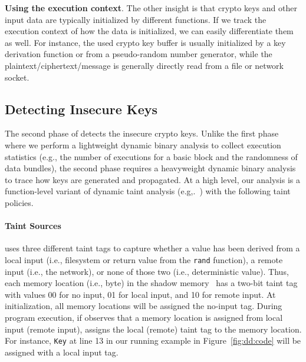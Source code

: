 {\begin{compactitem}
\item \textbf{Using the execution context}.
The other insight is that crypto keys and other input data are typically initialized by different functions. 
If we track the execution context of how the data is initialized, we can easily differentiate them as well. 
For instance, the used crypto key buffer is usually initialized by a key derivation function or from a pseudo-random number generator, while the plaintext/ciphertext/message is generally directly read from a file or network socket. 

\end{compactitem}


\subsection{Detecting Insecure Keys}
\label{sec:analysis:misuse}

The second phase of \sysname detects the insecure crypto keys. 
Unlike the first phase where we perform a lightweight dynamic binary analysis to collect execution statistics (e.g., the number of executions for a basic block and the randomness of data bundles), the second phase requires a heavyweight dynamic binary analysis to trace how keys are generated and propagated.
At a high level, our analysis is a function-level variant of dynamic taint analysis (e.g,.~\cite{song2005ndss, schwartz2010oakland}) with the following taint policies. 

\paragraph{Taint Sources} 
\sysname uses three different taint tags to capture whether a value has been derived from a local input  (i.e., filesystem or return value from the \texttt{rand} function), a remote input (i.e., the network), or 
none of those two (i.e., deterministic value). 
Thus,  each memory location (i.e., byte) in the shadow memory~\cite{schwartz2010oakland} has a two-bit taint tag with values 00 for no input, 01 for local input, and 10 for remote input.  
At initialization, all memory locations will be assigned the no-input tag. 
During program execution, if \sysname observes that a memory location is assigned from local input (remote input), \sysname assigns the local (remote) taint tag to the memory location. 
For instance, \texttt{Key} at line 13 in our running example in Figure~\ref{fig:dd:code} will be assigned with a local input tag. 


}
